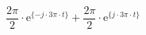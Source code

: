 \[
 \frac{2\pi}{2}\cdot\textrm{e}^{\{-j \cdot 3\pi \cdot t \}}
+\frac{2\pi}{2}\cdot\textrm{e}^{\{ j \cdot 3\pi \cdot t \}}
\]
